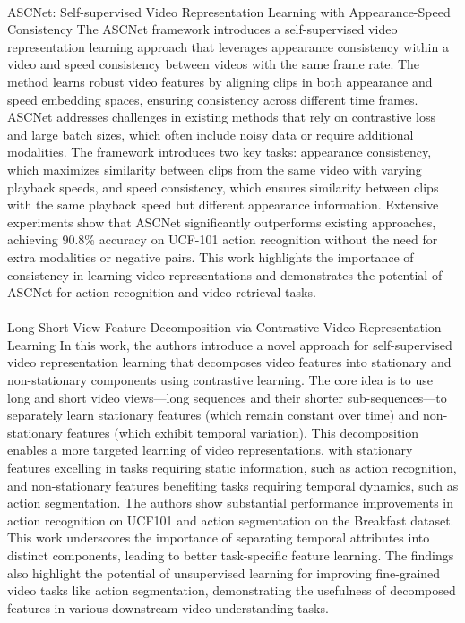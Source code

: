 \documentclass[11pt,a4paper]{report}
\begin{document}
\paragraph{} ASCNet: Self-supervised Video Representation Learning with Appearance-Speed Consistency \cite{huang2021ascnet}
The ASCNet framework introduces a self-supervised video representation learning approach that leverages appearance consistency within a video and speed consistency between videos with the same frame rate. The method learns robust video features by aligning clips in both appearance and speed embedding spaces, ensuring consistency across different time frames. ASCNet addresses challenges in existing methods that rely on contrastive loss and large batch sizes, which often include noisy data or require additional modalities. The framework introduces two key tasks: appearance consistency, which maximizes similarity between clips from the same video with varying playback speeds, and speed consistency, which ensures similarity between clips with the same playback speed but different appearance information. Extensive experiments show that ASCNet significantly outperforms existing approaches, achieving 90.8\% accuracy on UCF-101 action recognition without the need for extra modalities or negative pairs. This work highlights the importance of consistency in learning video representations and demonstrates the potential of ASCNet for action recognition and video retrieval tasks.

\paragraph{} Long Short View Feature Decomposition via Contrastive Video Representation Learning
In this work, the authors introduce a novel approach for self-supervised video representation learning that decomposes video features into stationary and non-stationary components using contrastive learning. The core idea is to use long and short video views—long sequences and their shorter sub-sequences—to separately learn stationary features (which remain constant over time) and non-stationary features (which exhibit temporal variation). This decomposition enables a more targeted learning of video representations, with stationary features excelling in tasks requiring static information, such as action recognition, and non-stationary features benefiting tasks requiring temporal dynamics, such as action segmentation. The authors show substantial performance improvements in action recognition on UCF101 and action segmentation on the Breakfast dataset. This work underscores the importance of separating temporal attributes into distinct components, leading to better task-specific feature learning. The findings also highlight the potential of unsupervised learning for improving fine-grained video tasks like action segmentation, demonstrating the usefulness of decomposed features in various downstream video understanding tasks.
\end{document}
